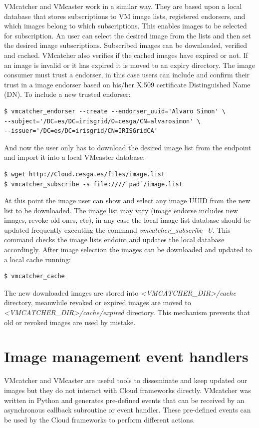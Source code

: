 \documentclass{cai}
\begin{document}
VMcatcher and VMcaster work in a similar way. They are based upon a local database that stores subscriptions to VM image lists, registered endorsers, and which images belong to which subscriptions. 
This enables images to be selected for subscription. An user can select the desired image from the lists and then set the desired image subscriptions.
Subscribed images can be downloaded, verified and cached. VMcatcher also verifies if the cached images have expired or not. If an image is invalid or it has expired it is moved to an expiry directory.
The image consumer must trust a endorser, in this case users can include and confirm their trust in a image endorser based on his/her X.509 certificate Distinguished Name (DN).
To include a new trusted endorser:
\begin{verbatim}
$ vmcatcher_endorser --create --endorser_uuid='Alvaro Simon' \
--subject='/DC=es/DC=irisgrid/O=cesga/CN=alvarosimon' \
--issuer='/DC=es/DC=irisgrid/CN=IRISGridCA'
\end{verbatim}
And now the user only has to download the desired image list from the endpoint and import it into a local VMcaster database:
\begin{verbatim}
$ wget http://Cloud.cesga.es/files/image.list
$ vmcatcher_subscribe -s file:////`pwd`/image.list
\end{verbatim}
At this point the image user can show and select any image UUID from the new list to be downloaded. 
The image list may vary (image endorse includes new images, revoke old ones, etc), in any case the local image list database should be updated frequently executing the command \textit{vmcatcher\_subscribe -U}.
This command checks the image lists endoint and updates the local database accordingly.
After image selection the images can be downloaded and updated to a local cache running:
\begin{verbatim}
$ vmcatcher_cache
\end{verbatim}

The new downloaded images are stored into \textit{<VMCATCHER\_DIR>\-/cache} directory, meanwhile revoked or expired images are moved to \textit{<VMCATCHER\_DIR>\-/cache\-/expired} directory. 
This mechanism prevents that old or revoked images are used by mistake.  


\section{Image management event handlers}
\label{sect-handlers}
VMcatcher and VMcaster are useful tools to disseminate and keep updated our images but they do not interact with Cloud frameworks directly.
VMcatcher was written in Python and generates pre-defined events that can be received by an asynchronous callback subroutine or event handler.
These pre-defined events can be used by the Cloud frameworks to perform different actions.
\end{document}
